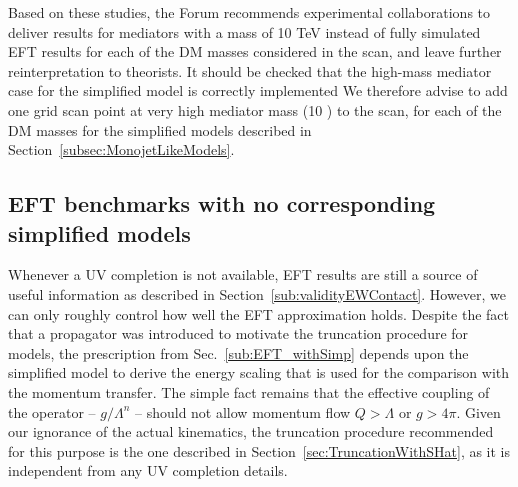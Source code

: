 \vskip20pt
	
Based on these studies, the Forum recommends experimental collaborations to deliver 
results for mediators with a mass of 10 TeV instead of fully simulated EFT results for each of the DM masses 
considered in the scan, and leave further reinterpretation to theorists.
It should be checked that the high-mass mediator case for the simplified model is correctly implemented 
We therefore advise to add one grid scan point at very high mediator mass (10 \tev) to the scan, 
for each of the DM masses for the simplified models described in Section~\ref{subsec:MonojetLikeModels}. 


\subsection{EFT benchmarks with no corresponding simplified models}


Whenever a UV completion is not available, EFT results are still
a source of useful information as 
described in Section~\ref{sub:validityEWContact}. 
However, we can only roughly control how well the EFT approximation holds.
Despite the fact that a propagator was introduced to motivate
the truncation procedure for \schannel models, the prescription from Sec.~\ref{sub:EFT_withSimp}
depends upon the simplified model to derive the
energy scaling that is used for the comparison with the momentum transfer. 
The simple fact remains that the effective
coupling of the operator -- $g/\Lambda^n$ -- should not allow
momentum flow $Q>\Lambda$ or $g>4\pi$.  Given our ignorance of
the actual kinematics, 
the truncation procedure recommended for this purpose
is the one described in Section~\ref{sec:TruncationWithSHat},
as it is independent from any UV completion details. 

